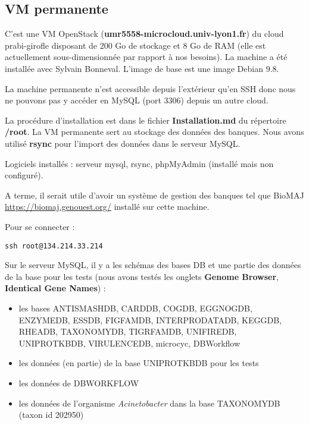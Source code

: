 \subsection {VM permanente}\label{VMpermanente}

C'est une VM OpenStack (\textbf{umr5558-microcloud.univ-lyon1.fr}) du cloud prabi-girofle disposant de 200 Go de stockage et 8 Go de RAM (elle est actuellement sous-dimensionnée par rapport à nos besoins). La machine a été installée avec Sylvain Bonneval. L'image de base est une image Debian 9.8.

La machine permanente n'est accessible depuis l'extérieur qu'en SSH donc nous ne pouvons pas y accéder en MySQL (port 3306) depuis un autre cloud.
\newline

La procédure d'installation est dans le fichier \textbf{Installation.md} du répertoire \textbf{/root}. La VM permanente sert au stockage des données des banques. Nous avons utilisé \textbf{rsync} pour l'import des données dans le serveur MySQL.
\newline

Logiciels installés : serveur mysql, rsync, phpMyAdmin (installé mais non configuré). 
\newline

A terme, il serait utile d'avoir un système de gestion des banques tel que BioMAJ \url{https://biomaj.genouest.org/} installé sur cette machine.

Pour se connecter : 
\begin{lstlisting}[style=bash]
ssh root@134.214.33.214
\end{lstlisting}
\bigskip

Sur le serveur MySQL, il y a les schémas des bases DB et une partie des données de la base pour les tests (nous avons testés les onglets \textbf{Genome Browser}, \textbf{Identical Gene Names}) :
\begin{itemize}
	\item les bases ANTISMASHDB, CARDDB, COGDB, EGGNOGDB, ENZYMEDB, ESSDB, FIGFAMDB, INTERPRODATADB, KEGGDB, RHEADB, TAXONOMYDB, TIGRFAMDB, UNIFIREDB, UNIPROTKBDB, VIRULENCEDB, microcyc, DBWorkflow
	\item les données (en partie) de la base UNIPROTKBDB pour les tests
	\item les données de DBWORKFLOW
	\item les données de l'organisme \textit{Acinetobacter} dans la base TAXONOMYDB (taxon id 202950)
\end{itemize}

